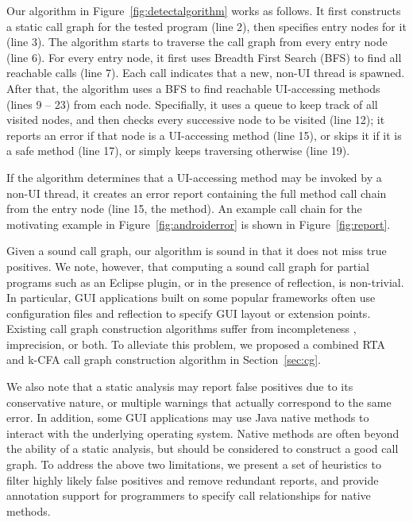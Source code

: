 Our algorithm in Figure~\ref{fig:detectalgorithm} works as follows. It
first constructs a static call graph for the tested program (line 2),
then specifies entry nodes for it (line 3). The algorithm starts to traverse
the call graph from every entry node (line 6). For every entry node,
it first uses Breadth First Search (BFS) to find all reachable
 calls (line 7). Each  call
indicates that a new, non-UI thread is spawned.  After that, 
the algorithm uses a BFS to find reachable UI-accessing methods (lines 9 -- 23)
from each  node.
Specifially, it uses a queue to keep track of all visited nodes, and
then checks every successive node to be visited (line 12);
it reports an error if that node
is a UI-accessing method (line 15), or skips it if it is
a safe method (line 17), or simply keeps traversing otherwise (line 19).

If the algorithm determines that a UI-accessing method may be invoked
by a non-UI thread, it creates an error report containing the full
method call chain from the entry node (line 15, the 
method). An example call chain for
the motivating example in Figure~\ref{fig:androiderror} is shown
in Figure~\ref{fig:report}.

Given a sound call graph, our algorithm is sound in that it does not
miss true positives. We note, however, that computing a sound
call graph for partial programs such as an Eclipse plugin,
or in the presence of reflection, is non-trivial. 
In particular, GUI applications built on some popular frameworks
often use configuration files and reflection to specify GUI layout
or extension points.
Existing call graph construction algorithms suffer from incompleteness
, imprecision, or both.  To alleviate this problem, 
we proposed a combined RTA
and k-CFA call graph construction algorithm in Section~\ref{sec:cg}.



We also note that a static analysis may report false positives due
to its conservative nature, or multiple warnings that actually correspond to
the same error. In addition, some GUI applications may use
Java native methods to interact with the underlying operating system.
Native methods are often beyond the ability of a static analysis, but
should be considered to construct a good call graph. To address the
above two limitations, we present a set of heuristics to filter
highly likely false positives and remove redundant reports, and provide
annotation support for programmers to specify call relationships for
 native methods.



